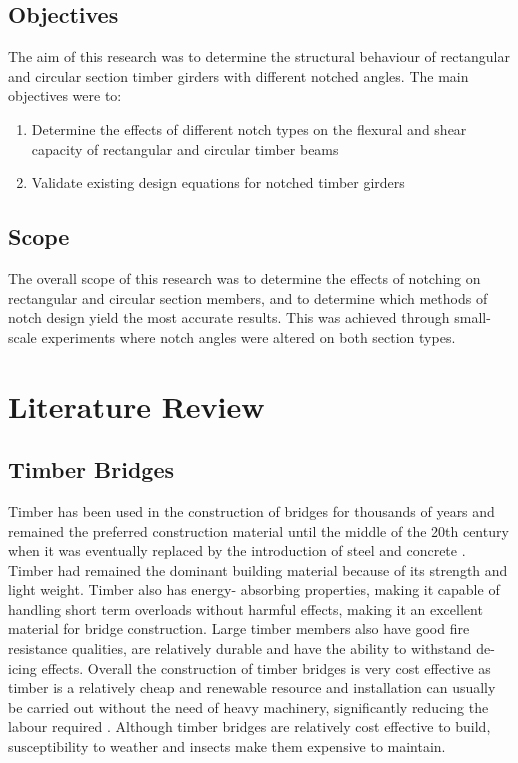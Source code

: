 \documentclass[11pt,a4paper]{article}
\numberwithin{equation}{subsection}
\begin{document}
	\subsection{Objectives}
	The aim of this research was to determine the structural behaviour of rectangular and circular section timber girders with different notched angles. The main objectives were to:\par 
	
	\begin{enumerate}
		\item Determine the effects of different notch types on the flexural and shear capacity of rectangular and circular timber beams
		\item Validate existing design equations for notched timber girders
	\end{enumerate}
	
	\subsection{Scope}
	\noindent
	The overall scope of this research was to determine the effects of notching on rectangular and circular section members, and to determine which methods of notch design yield the most accurate results. This was achieved through small-scale experiments where notch angles were altered on both section types. 
	
	\pagebreak
	
	\section{Literature Review}
	
	\subsection{Timber Bridges}
	Timber has been used in the construction of bridges for thousands of years \cite{ritter_timber_1990} and remained the preferred construction material until the middle of the 20th century when it was eventually replaced by the introduction of steel and concrete \cite{ritter_timber_1990,_timber_2005} . Timber had remained the dominant building material because of its strength and light weight. Timber also has energy- absorbing properties, making it capable of handling short term overloads without harmful effects, making it an excellent material for bridge construction. Large timber members also have good fire resistance qualities, are relatively durable and have the ability to withstand de-icing effects. Overall the construction of timber bridges is very cost effective as timber is a relatively cheap and renewable resource and installation can usually be carried out without the need of heavy machinery, significantly reducing the labour required \cite{ritter_timber_1990}. Although timber bridges are relatively cost effective to build, susceptibility to weather and insects make them expensive to maintain.
	
\end{document}
